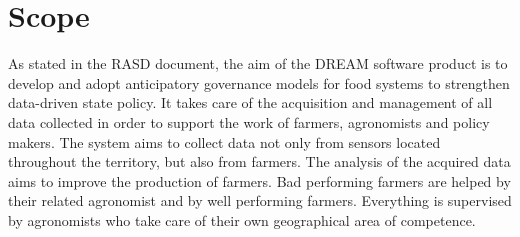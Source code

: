 \section{Scope}
As stated in the RASD document, the aim of the DREAM software product is to develop and adopt anticipatory governance models for food systems to strengthen data-driven state policy. It takes care of the acquisition and management of all data collected in order to support the work of farmers, agronomists and policy makers. The system aims to collect data not only from sensors located throughout the territory, but also from farmers. The analysis of the acquired data aims to improve the production of farmers. Bad performing farmers are helped by their related agronomist and by well performing farmers. Everything is supervised by agronomists who take care of their own geographical area of competence.
